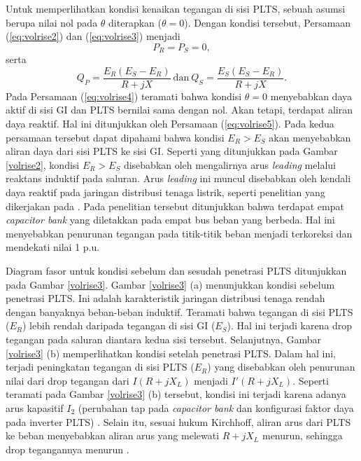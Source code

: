 {Untuk memperlihatkan kondisi kenaikan tegangan di sisi PLTS, sebuah asumsi berupa nilai nol pada $\theta$ diterapkan ($\theta=0$). Dengan kondisi tersebut, Persamaan (\ref{eq:volrise2}) dan (\ref{eq:volrise3}) menjadi
\begin{equation}\label{eq:volrise4}
	P_R = P_S = 0,
\end{equation}
serta
\begin{equation}\label{eq:volrise5}
	Q_P = \dfrac{E_R(E_S - E_R)}{R+jX} \ \text{dan}\  Q_S = \dfrac{E_S(E_S - E_R)}{R+jX}.
\end{equation}
Pada Persamaan (\ref{eq:volrise4}) teramati bahwa kondisi $\theta=0$ menyebabkan daya aktif di sisi GI dan PLTS bernilai sama dengan nol. Akan tetapi, terdapat aliran daya reaktif. Hal ini ditunjukkan oleh Persamaan (\ref{eq:volrise5}). Pada kedua persamaan tersebut dapat dipahami bahwa kondisi $E_R > E_S$ akan menyebabkan aliran daya dari sisi PLTS ke sisi GI. Seperti yang ditunjukkan pada Gambar \ref{volrise2}, kondisi $E_R > E_S$ disebabkan oleh mengalirnya arus \textit{leading} melalui reaktans induktif pada saluran. Arus \textit{leading} ini muncul disebabkan oleh kendali daya reaktif pada jaringan distribusi tenaga listrik, seperti penelitian yang dikerjakan pada \cite{ding_distributed_2017}. Pada penelitian tersebut ditunjukkan bahwa terdapat empat \textit{capacitor bank} yang diletakkan pada empat bus beban yang berbeda. Hal ini menyebabkan penurunan tegangan pada titik-titik beban menjadi terkoreksi dan mendekati nilai 1 p.u.

Diagram fasor untuk kondisi sebelum dan sesudah penetrasi PLTS ditunjukkan pada Gambar \ref{volrise3}. Gambar \ref{volrise3} (a) menunjukkan kondisi sebelum penetrasi PLTS. Ini adalah karakteristik jaringan distribusi tenaga rendah dengan banyaknya beban-beban induktif. Teramati bahwa tegangan di sisi PLTS ($E_R$) lebih rendah daripada tegangan di sisi GI ($E_S$). Hal ini terjadi karena drop tegangan pada saluran diantara kedua sisi tersebut. Selanjutnya, Gambar \ref{volrise3} (b) memperlihatkan kondisi setelah penetrasi PLTS. Dalam hal ini, terjadi peningkatan tegangan di sisi PLTS ($E_R$) \cite{hasheminamin_index-based_2015,mai_adaptive_2021} yang disebabkan oleh penurunan nilai dari drop tegangan dari $I(R+jX_L)$ menjadi $I'(R+jX_L)$. Seperti teramati pada Gambar \ref{volrise3} (b) tersebut, kondisi ini terjadi karena adanya arus kapasitif $I_2$ (perubahan tap pada \textit{capacitor bank} dan konfigurasi faktor daya pada inverter PLTS) \cite{ding_distributed_2017}. Selain itu, sesuai hukum Kirchhoff, aliran arus dari PLTS ke beban menyebabkan aliran arus yang melewati $R+jX_L$ menurun, sehingga drop tegangannya menurun \cite{mai_adaptive_2021}.

}
